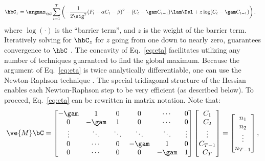 \begin{align} \label{eq:eta}
\hbC_{\zzz} &= \argmax_{\bC}  \sum_{t=1}^T \left( -\frac{1}{2 \sig^2}(F_t - \alpha C_t - \beta)^2  -  (C_t-\gam C_{t-1})  \lam \Del + \zzz \log (C_t-\gam C_{t-1}) \right).
\end{align}
\noindent where $\log (\cdot)$ is the ``barrier term'', and $z$ is the weight of the barrier term.  Iteratively solving for $\hbC_{\zzz}$ for $z$ going from one down to nearly zero, guarantees convergence to $\hbC$ \cite{CONV04}. %
The concavity of Eq.~\eqref{eq:eta} facilitates utilizing any number of techniques guaranteed to find the global maximum.  Because the argument of Eq.~\eqref{eq:eta} is twice analytically differentiable, one can use the Newton-Raphson technique \cite{Press92}. The special tridiagonal structure of the Hessian enables each Newton-Raphson step to be very efficient (as described below).  To proceed, Eq.~\eqref{eq:eta} can be rewritten in matrix notation.  Note that:
\begin{align} \label{eq:M}
\ve{M} \bC = %
\begin{bmatrix}
-\gam & 1 & 0 & 0 & \cdots & 0 \\
0 & -\gam & 1 & 0 & \cdots  & 0 \\
\vdots & \ddots & \ddots & \ddots & \ddots & \vdots  \\
0 & \cdots & 0  & -\gam & 1 & 0 \\
0 & \cdots & 0 & 0 & -\gam & 1
\end{bmatrix}
\begin{bmatrix}
C_1 \\ C_2 \\  \vdots \\ C_{T-1} \\ C_T
\end{bmatrix}
= 
\begin{bmatrix}
n_1 \\ n_2 \\ \vdots  \\ n_{T-1}
\end{bmatrix}
, %
\end{align}
